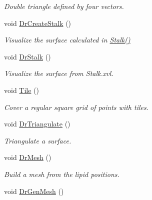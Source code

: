 \begin{DoxyCompactItemize}
\begin{DoxyCompactList}\small\item\em Double triangle defined by four vectors. \end{DoxyCompactList}\item 
void \hyperlink{classElPoly_a62e3f72464b15b655d7c683ad3c1393f}{Dr\+Create\+Stalk} ()\hypertarget{classElPoly_a62e3f72464b15b655d7c683ad3c1393f}{}\label{classElPoly_a62e3f72464b15b655d7c683ad3c1393f}

\begin{DoxyCompactList}\small\item\em Visualize the surface calculated in \hyperlink{classVarData_a7521c027e75a7b726b1afb9f800301f6}{Stalk()} \end{DoxyCompactList}\item 
void \hyperlink{classElPoly_a1003dbb97e1d997e641cc0b8c4d82ba2}{Dr\+Stalk} ()\hypertarget{classElPoly_a1003dbb97e1d997e641cc0b8c4d82ba2}{}\label{classElPoly_a1003dbb97e1d997e641cc0b8c4d82ba2}

\begin{DoxyCompactList}\small\item\em Visualize the surface from Stalk.\+xvl. \end{DoxyCompactList}\item 
void \hyperlink{classElPoly_a936b5ae489361c88bca90698f6316f27}{Tile} ()\hypertarget{classElPoly_a936b5ae489361c88bca90698f6316f27}{}\label{classElPoly_a936b5ae489361c88bca90698f6316f27}

\begin{DoxyCompactList}\small\item\em Cover a regular square grid of points with tiles. \end{DoxyCompactList}\item 
void \hyperlink{classElPoly_a064da013f0a35aeb162a8f11e847117b}{Dr\+Triangulate} ()\hypertarget{classElPoly_a064da013f0a35aeb162a8f11e847117b}{}\label{classElPoly_a064da013f0a35aeb162a8f11e847117b}

\begin{DoxyCompactList}\small\item\em Triangulate a surface. \end{DoxyCompactList}\item 
void \hyperlink{classElPoly_a2c774ae632488cd2f9fe00fece284d00}{Dr\+Mesh} ()\hypertarget{classElPoly_a2c774ae632488cd2f9fe00fece284d00}{}\label{classElPoly_a2c774ae632488cd2f9fe00fece284d00}

\begin{DoxyCompactList}\small\item\em Build a mesh from the lipid positions. \end{DoxyCompactList}\item 
void \hyperlink{classElPoly_a8ff8e8575c77b1ae89dfb13d609a67cf}{Dr\+Gen\+Mesh} ()\hypertarget{classElPoly_a8ff8e8575c77b1ae89dfb13d609a67cf}{}\label{classElPoly_a8ff8e8575c77b1ae89dfb13d609a67cf}


\end{DoxyCompactItemize}
